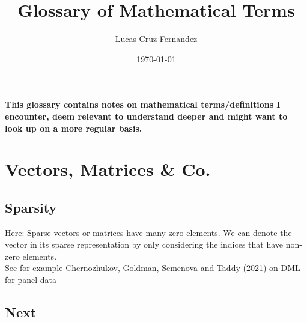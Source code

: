 \documentclass[12pt]{article}
\title{Glossary of Mathematical Terms}
\author{Lucas Cruz Fernandez}
\date{\today}
\begin{document}
    \maketitle 
    \noindent \textbf{This glossary contains notes on mathematical terms/definitions I encounter, deem relevant to understand deeper and might want to look up on a more regular basis.}

    \tableofcontents

    \newpage 
    
    \section{Vectors, Matrices \& Co.}
    
    \subsection{Sparsity}
    Here: Sparse vectors or matrices have many zero elements. We can denote the vector in its sparse representation by only considering the indices that have non-zero elements. \\
    See for example Chernozhukov, Goldman, Semenova and Taddy (2021) on DML for panel data 

    \subsection{Next }
\end{document}
